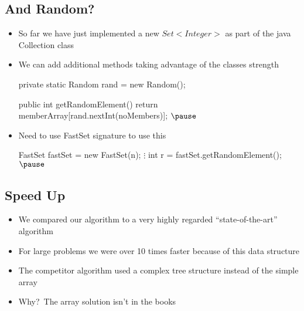 \begin{slide}
\section[-1]{And Random?}

\begin{PauseHighLight}
  \begin{itemize}
  \item So far we have just implemented a new \jl$Set<Integer>$ as part
    of the java Collection class\pause
  \item We can add additional methods taking advantage of the classes
    strength
    \begin{java}
   private static Random rand = new Random();
   
   public int getRandomElement() {
      return memberArray[rand.nextInt(noMembers)];
   }$\pause$
    \end{java}
  \item Need to use FastSet signature to use this
    \begin{java}
   FastSet fastSet = new FastSet(n);
   $\vdots$
   int r = fastSet.getRandomElement();$\pause$
    \end{java}
  \end{itemize}
\end{PauseHighLight}

\end{slide}


\begin{slide}
\section{Speed Up}

\begin{PauseHighLight}
  \begin{itemize}
  \item We compared our algorithm to a very highly regarded
    ``state-of-the-art'' algorithm\pause
  \item For large problems we were over 10 times faster because of this
    data structure\pause
  \item The competitor algorithm used a complex tree structure instead
    of the simple array\pause
  \item Why?\pause\ The array solution isn't in the books\pauseb
  \end{itemize}
\end{PauseHighLight}

\end{slide}

